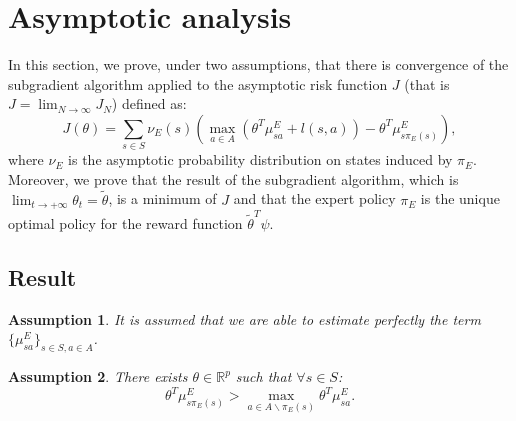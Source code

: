 \documentclass[tablecaption=bottom]{jmlr}
\newtheorem{assumption}{Assumption}
\begin{document}
%




\section{Asymptotic analysis}\label{proof.sec}
In this section, we prove, under two assumptions, that there is
convergence of the subgradient algorithm applied to the asymptotic
risk function $J$ (that is $J = \lim_{N\rightarrow\infty} J_N$)
defined as:
\begin{equation}
J(\theta)=\sum_{s\in S}\nu_E(s)(\max_{a \in A}(\theta^T\mu^E_{sa}+l(s,a))-\theta^T\mu^E_{s\pi_E(s)}),
\end{equation}
where $\nu_E$ is the asymptotic probability distribution on states
induced by $\pi_E$. Moreover, we prove that the result of the
subgradient algorithm, which is
$\lim_{t\rightarrow+\infty}\theta_t=\tilde{\theta}$, is a minimum of
$J$ and that the expert policy $\pi_E$ is the unique optimal policy
for the reward function $\tilde{\theta}^T\psi$.


\subsection{Result}
\begin{assumption}
\label{assumption1}
It is assumed that we are able to estimate perfectly the term $\{\mu^E_{sa}\}_{s\in S,a\in A}$.
\end{assumption}


\begin{assumption}
\label{assumption2}
There exists $\theta\in\mathbb{R}^p$ such that $\forall s\in S$:
\begin{equation}
\label{existence.eq}
\theta^T\mu^E_{s\pi_E(s)}>\max_{a \in A\backslash\pi_E(s)}\theta^T\mu^E_{sa}.
\end{equation}
\end{assumption}
\end{document}

